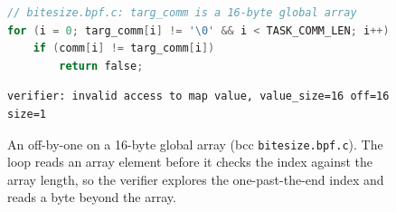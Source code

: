 \begin{figure}[t]
  \begin{lstlisting}[style=bpfix,language=C]
// bitesize.bpf.c: targ_comm is a 16-byte global array
for (i = 0; targ_comm[i] != '\0' && i < TASK_COMM_LEN; i++)
    if (comm[i] != targ_comm[i])
        return false;
  \end{lstlisting}
  \begin{lstlisting}[style=bpflog]
verifier: invalid access to map value, value_size=16 off=16 size=1
  \end{lstlisting}
  \caption{An off-by-one on a 16-byte global array (bcc \texttt{bitesize.bpf.c}). The loop reads an array element before it checks the index against the array length, so the verifier explores the one-past-the-end index and reads a byte beyond the array.}
  \label{fig:capacity}
\end{figure}
